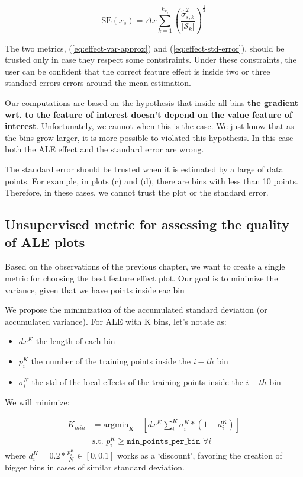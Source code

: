 \documentclass[wcp]{jmlr}
\newcommand{\1}{\mathbbm{1}}
\begin{document}
\begin{equation}
  \label{eq:effect-std-error}
  \text{SE}(x_s) = \Delta x \sum_{k=1}^{k_{x_s}} (\frac{\hat{\sigma}_{s,k}^2}{|\mathcal{S}_k|})^\frac{1}{2}
\end{equation}


The two metrics, (\ref{eq:effect-var-approx}) and
(\ref{eq:effect-std-error}), should be trusted only in case they
respect some contstraints. Under these constraints, the user can be
confident that the correct feature effect is inside two or three
standard errors errors around the mean estimation.


Our computations are based on the hypothesis that inside
all bins \textbf{the gradient wrt. to the feature of interest doesn't
  depend on the value feature of interest}. Unfortunately, we cannot
when this is the case. We just know that as the bins grow larger, it
is more possible to violated this hypothesis. In this case both the
ALE effect and the standard error are wrong.

The standard error should be trusted when it is estimated by a large
of data points. For example, in plots (c) and (d), there are bins with
less than 10 points. Therefore, in these cases, we cannot trust the
plot or the standard error.

\subsection{Unsupervised metric for assessing the quality of ALE plots}

Based on the observations of the previous chapter, we want to create a
single metric for choosing the best feature effect plot. Our goal is
to minimize the variance, given that we have points inside eac bin 

We propose the minimization of the accumulated standard deviation (or
accumulated variance). For ALE with K bins, let's notate as:

\begin{itemize}
\item \(dx^K\) the length of each bin
\item \(p_i^K \) the number of the training points inside the \(i-th\) bin
\item \(\sigma_i^K \) the std of the local effects of the training points inside the \(i-th\) bin
\end{itemize}
%
We will minimize:

\begin{align} \label{eq:min-criterion}
  K_{min} &= \text{argmin}_{K} \quad  [dx^K  \sum_i^K \sigma_i^K * (1 - d_i^K)]\\
  & \text{s.t. } p_i^K \geq \texttt{min\_points\_per\_bin } \forall i
\end{align}
%
where \(d_i^K = 0.2 * \frac{p_i^K}{N} \in [0,0.1] \) works as a `discount', favoring the
creation of bigger bins in cases of similar standard deviation.
\end{document}
